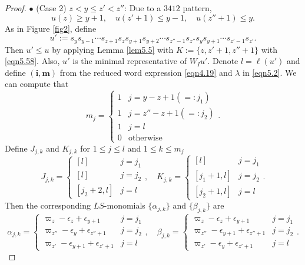 \documentclass[12pt]{amsart}
\theoremstyle{definition}
\theoremstyle{remark}
\begin{document}
\begin{proof}
$\bullet$ (Case 2) $z<y \leq z' <z''$: Due to a $3412$ pattern,
\begin{equation}\label{eqn5.58}
u(z) \geq y+1, \quad u(z' +1) \leq y-1, \quad u(z''+1) \leq y.
\end{equation}
As in Figure \ref{fig2}, define
\begin{equation}\label{eqn4.19}
u':= s_y s_{y-1} \cdots s_{z+1} s_z s_{y+1} s_{y+2} \cdots s_{z''-1} s_{z''} s_{y} s_{y+1} \cdots s_{z' -1} s_{z'}.
\end{equation}
Then $u' \leq u$ by applying Lemma \ref{lem5.5} with $K:= \{ z , z'+1 , z''+1 \}$ with \eqref{eqn5.58}. Also, $u'$ is the minimal representative of $W_I u'$. Denote $l = \ell (u')$ and define $(\mathbf{i}, \mathbf{m})$ from the reduced word expression \eqref{eqn4.19} and $\lambda$ in \eqref{eqn5.2}. We can compute that
\begin{equation}\label{eqn4.20}
m_j =
\begin{cases}
1 & j = y-z+1 (=: j_1) \\
1& j = z''-z+1 (=:j_2) \\
1 & j = l \\
0 & \text{otherwise}
\end{cases}
.
\end{equation}
Define $J_{j,k}$ and $K_{j,k}$ for $1 \leq j \leq l$ and $1 \leq k \leq m_j$
\begin{equation}\label{eqn4.21}
J_{j,k} =
\begin{cases}
[l] & j=j_1\\
[l] & j = j_2  \\
[j_2+2 , l] & j=l
\end{cases}
, \quad K_{j,k} = 
\begin{cases}
[l] & j=j_1\\
[j_1+1 , l] & j = j_2 \\
[j_2+1,l] & j = l 
\end{cases}
.
\end{equation}
Then the corresponding $LS$-monomials $\{\alpha_{j,k}\}$ and $\{\beta_{j,k}\}$ are
\begin{subequations}\label{eqn4.24}
\begin{equation}\label{eqn4.25}
\alpha_{j,k}=
\begin{cases}
\varpi_z - \epsilon_z + \epsilon_{y+1} & j=j_1 \\
\varpi_{z''} - \epsilon_{y} + \epsilon_{z''+1}& j=j_2 \\
\varpi_{z'}-\epsilon_{y+1}+\epsilon_{z'+1} & j=l
\end{cases}
, \quad \beta_{j,k} = 
\begin{cases}
\varpi_z - \epsilon_z + \epsilon_{y+1} & j=j_1 \\
\varpi_{z''} - \epsilon_{y+1} + \epsilon_{z''+1}& j=j_2 \\
\varpi_{z'}-\epsilon_{y}+\epsilon_{z'+1} & j=l
\end{cases}
.
\end{equation}
\end{subequations}


\end{proof}
\end{document}
